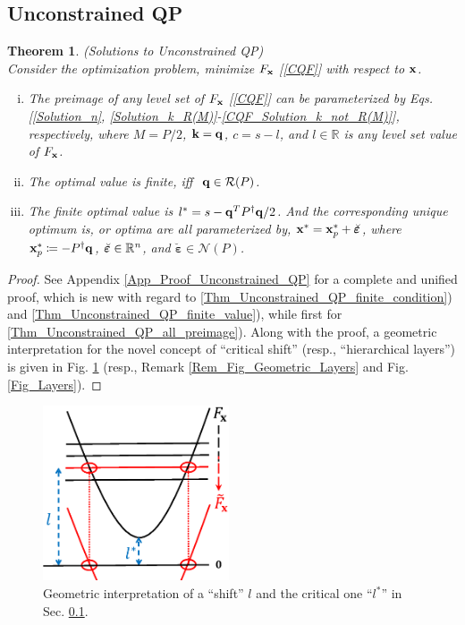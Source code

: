 \documentclass[9pt,twocolumn,twoside,lineno]{pnas-new-1}
\newcommand{\bfx}{{\bf x}}
\newcommand{\bfq}{{\bf q}}
\newcommand{\bfk}{{\bf k}}
\newcommand{\bfvarepsilon}{{\boldsymbol \varepsilon}}
\newcommand{\real}{\mathbb{R}}
\newcommand{\calN}{{\mathcal N}}
\newcommand{\calR}{{\mathcal R}}
\newcommand{\itn}{{\it n}}
\newtheorem{theorem}{Theorem}[section]
\theoremstyle{remark}
\begin{document}
\subsection{Unconstrained QP}
\label{Subsec_Unconstrained_QP}

\begin{theorem} (Solutions to Unconstrained QP)\\
Consider the optimization problem, minimize $F_\bfx$ {\rm[\ref{CQF}]} with respect to $\bfx$.
\begin{enumerate}[i)]
\item\label{Thm_Unconstrained_QP_all_preimage} The preimage of any level set of $F_\bfx$ {\rm[\ref{CQF}]} can be parameterized by Eqs. {\rm[\ref{Solution_n}}, {\rm\ref{Solution_k_R(M)}-\ref{CQF_Solution_k_not_R(M)}]}, respectively, where $M=P/2$, $\bfk=\bfq$, $c=s-l$, and $l\in\real$ is any level set value of $F_\bfx$.
\item\label{Thm_Unconstrained_QP_finite_condition} The optimal value is finite, iff $~\bfq\in\calR(P)$.
\item\label{Thm_Unconstrained_QP_finite_value} The finite optimal value is $l^*=s-\bfq^T P^\dagger\bfq/2$. And the corresponding unique optimum is, or optima are all parameterized by, $\bfx^*=\bfx_p^*+\breve\bfvarepsilon$, where $\bfx_p^*\coloneqq-P^\dagger\bfq$, $\breve\bfvarepsilon\in\real^\itn$, and $\breve\bfvarepsilon\in \calN(P)$.
\end{enumerate}
\label{Thm_Unconstrained_QP}
\end{theorem}

\begin{proof}
See Appendix \ref{App_Proof_Unconstrained_QP} for a complete and unified proof, which is new with regard to \ref{Thm_Unconstrained_QP_finite_condition}) and \ref{Thm_Unconstrained_QP_finite_value}), while first for \ref{Thm_Unconstrained_QP_all_preimage}). Along with the proof, a geometric interpretation for the novel concept of ``critical shift'' (resp., ``hierarchical layers'') is given in Fig. \ref{Fig_Shift} (resp., Remark \ref{Rem_Fig_Geometric_Layers} and Fig. \ref{Fig_Layers}).
\end{proof}

\begin{figure}[htbp]
    \begin{center}
    \includegraphics[width=5.5cm]{Fig_Shift.eps}
    \caption{Geometric interpretation of a ``shift'' $l$ and the critical one ``$l^*$'' in Sec. {\rm\ref{Subsec_Unconstrained_QP}}.}
    \label{Fig_Shift}
    \end{center}
\end{figure}
\end{document}
